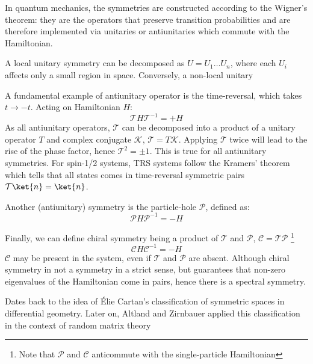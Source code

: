 In quantum mechanics, the symmetries are constructed according to the Wigner's theorem: they are the operators that preserve transition probabilities and are therefore implemented via unitaries or antiunitaries which commute with the Hamiltonian. 

A local unitary symmetry can be decomposed as $U = U_1 \ldots U_n$, where each $U_i$ affects only a small region in space. Conversely, a non-local unitary 

A fundamental example of antiunitary operator is the time-reversal, which takes $t \rightarrow -t$. Acting on Hamiltonian $H$:
\begin{equation}
\mathcal{T}  H \mathcal{T}^{-1} = + H
\end{equation}
As all antiunitary operators, $\mathcal{T}$ can be decomposed into a product of a unitary operator $T$ and complex conjugate $\mathcal{K}$, $\mathcal{T} = T \mathcal{K}$. Applying $\mathcal{T}$ twice will lead to the rise of the phase factor, hence $\mathcal{T}^2 = \pm 1$. This is true for all antiunitary symmetries. For spin-1/2 systems, TRS systems follow the Kramers' theorem which tells that all states comes in time-reversal symmetric pairs $\mathcal{T} \ket{n} = \ket{n}$.

Another (antiunitary) symmetry is the particle-hole $\mathcal{P}$, defined as:
\begin{equation}
\mathcal{P}  H \mathcal{P}^{-1} = - H
\end{equation}

Finally, we can define chiral symmetry being a product of $\mathcal{T}$ and $\mathcal{P}$, $\mathcal{C}= \mathcal{TP}$ \footnote{Note that $\mathcal{P}$ and $\mathcal{C}$ anticommute with the single-particle Hamiltonian}
\begin{equation}
\mathcal{C}  H \mathcal{C}^{-1} = - H
\end{equation}
$\mathcal{C}$ may be present in the system, even if $\mathcal{T}$ and $\mathcal{P}$ are absent. Although chiral symmetry in not a symmetry in a strict sense, but guarantees that non-zero eigenvalues of the Hamiltonian come in pairs, hence there is a spectral symmetry.




Dates back to the idea of \'{E}lie Cartan's classification of symmetric spaces in differential geometry. Later on, Altland and Zirnbauer applied this classification in the context of random matrix theory~\cite{AltlandZirnbauer1997}




